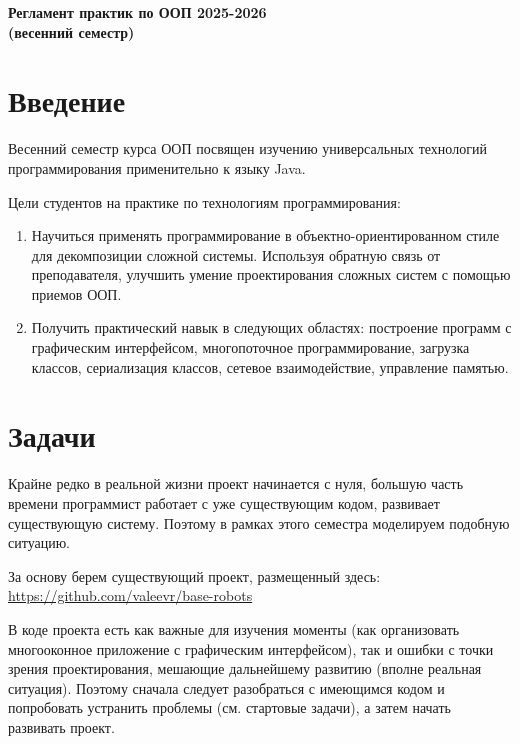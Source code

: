 \documentclass[a4paper,12pt]{article}
\begin{document}
\begin{titlepage}
    \begin{center}
        \textbf{\Large Регламент практик по ООП 2025-2026 \\ (весенний семестр)}
        \vspace{5cm}
    \end{center}
\end{titlepage}

\newpage
\tableofcontents
\newpage

\section{Введение}

Весенний семестр курса ООП посвящен изучению универсальных технологий программирования применительно к языку Java.

Цели студентов на практике по технологиям программирования:
\begin{enumerate}
    \item Научиться применять программирование в объектно-ориентированном стиле для декомпозиции сложной системы. Используя обратную связь от преподавателя, улучшить умение проектирования сложных систем с помощью приемов ООП.
    \item Получить практический навык в следующих областях: построение программ с графическим интерфейсом, многопоточное программирование, загрузка классов, сериализация классов, сетевое взаимодействие, управление памятью.
\end{enumerate}

\section{Задачи}

Крайне редко в реальной жизни проект начинается с нуля, большую часть времени программист работает с уже существующим кодом, развивает существующую систему. Поэтому в рамках этого семестра моделируем подобную ситуацию.

За основу берем существующий проект, размещенный здесь: \\
\url{https://github.com/valeevr/base-robots}

В коде проекта есть как важные для изучения моменты (как организовать многооконное приложение с графическим интерфейсом), так и ошибки с точки зрения проектирования, мешающие дальнейшему развитию (вполне реальная ситуация). Поэтому сначала следует разобраться с имеющимся кодом и попробовать устранить проблемы (см. стартовые задачи), а затем начать развивать проект.
\end{document}
